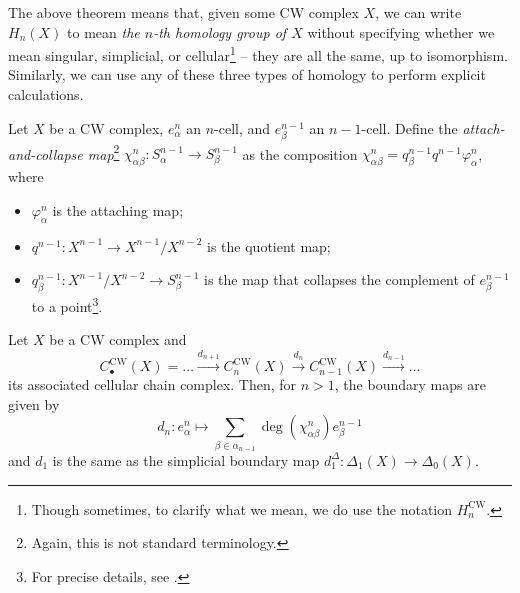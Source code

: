 \documentclass[12pt]{article}
\numberwithin{equation}{subsection}
\numberwithin{theorem}{subsection}
\numberwithin{lemma}{subsection}
\numberwithin{corollary}{subsection}
\numberwithin{definition}{subsection}
\numberwithin{example}{subsection}
\numberwithin{note}{subsection}
\begin{document}
\begin{appendices}
            The above theorem means that, given some CW complex $X$, we can write $H_n(X)$ to mean \emph{the $n$-th homology group of $X$} without specifying whether we mean singular, simplicial, or cellular\footnote{
                Though sometimes, to clarify what we mean, we do use the notation $H_n^\text{CW}$.
            } -- they are all the same, up to isomorphism.
            Similarly, we can use any of these three types of homology to perform explicit calculations.

            \begin{definition}
                Let $X$ be a CW complex, $e_\alpha^n$ an $n$-cell, and $e_\beta^{n-1}$ an $n-1$-cell.
                Define the \emph{attach-and-collapse map}\footnote{
                    Again, this is not standard terminology.
                } \emph{$\chi^n_{\alpha\beta}\colon S_\alpha^{n-1}\to S_\beta^{n-1}$} as the composition $\chi^n_{\alpha\beta}=q_\beta^{n-1} q^{n-1}\varphi_\alpha^n$, where
                \begin{itemize}
                    \item $\varphi_\alpha^n$ is the attaching map;
                    \item $q^{n-1}\colon X^{n-1}\to X^{n-1}/X^{n-2}$ is the quotient map;
                    \item $q_\beta^{n-1}\colon X^{n-1}/X^{n-2}\to S_\beta^{n-1}$ is the map that collapses the complement of $e_\beta^{n-1}$ to a point\footnote{
                        For precise details, see \cite[141]{hatcher2002algebraic}.
                    }.\qedhere
                \end{itemize}
            \end{definition}

            \begin{theorem}\label{th:cellular-boundary-formula}
                Let $X$ be a CW complex and
                \begin{equation*}
                    C_\bullet^{\text{CW}}(X) = \ldots \xrightarrow{d_{n+1}} C_n^{\text{CW}}(X) \xrightarrow{d_n} C_{n-1}^{\text{CW}}(X) \xrightarrow{d_{n-1}} \ldots
                \end{equation*}
                its associated cellular chain complex.
                Then, for $n>1$, the boundary maps are given by
                \begin{equation*}
                    d_n\colon e^n_\alpha \mapsto \sum_{\beta\in \alpha_{n-1}} \deg\left(\chi^n_{\alpha\beta}\right) e^{n-1}_\beta
                \end{equation*}
                and $d_1$ is the same as the simplicial boundary map $d_1^\Delta\colon\Delta_1(X)\to\Delta_0(X)$.
            \end{theorem}


\end{appendices}
\end{document}
